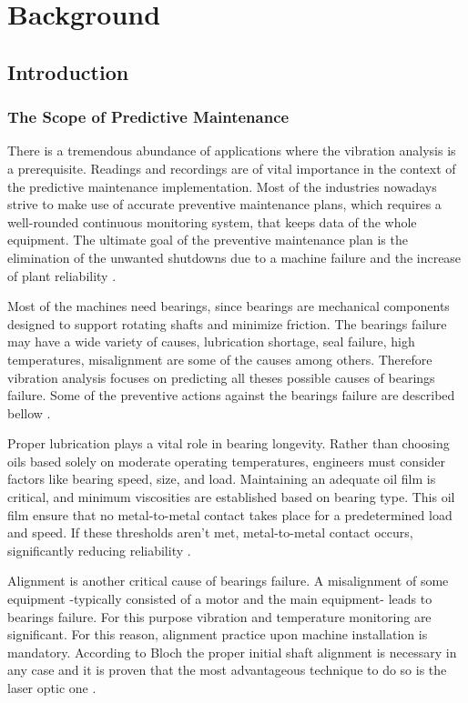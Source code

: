 \chapter{Background}
\label{chap2}



\section{Introduction}

\subsection{The Scope of Predictive Maintenance}
{

There is a tremendous abundance of applications where the vibration analysis is a prerequisite. Readings and recordings are of vital importance in the context of the predictive maintenance implementation. Most of the industries nowadays strive to make use of accurate preventive maintenance plans, which requires a well-rounded continuous monitoring system, that keeps data of the whole equipment. The ultimate goal of the preventive maintenance plan is the elimination of the unwanted shutdowns due to a machine failure and the increase of plant reliability \cite{DehayemNodem2011}.

Most of the machines need bearings, since bearings are mechanical components designed to support rotating shafts and minimize friction. The bearings failure may have a wide variety of causes, lubrication shortage, seal failure, high temperatures, misalignment are some of the causes among others. Therefore vibration analysis focuses on predicting all theses possible causes of bearings failure. Some of the preventive actions against the bearings failure are described bellow \cite{Li2001}.

Proper lubrication plays a vital role in bearing longevity. Rather than choosing oils based solely on moderate operating temperatures, engineers must consider factors like bearing speed, size, and load. Maintaining an adequate oil film is critical, and minimum viscosities are established based on bearing type. This oil film ensure that no metal-to-metal contact takes place for a predetermined load and speed. If these thresholds aren't met, metal-to-metal contact occurs, significantly reducing reliability \cite{Bloch1998}.

Alignment is another critical cause of bearings failure. A misalignment of some equipment -typically consisted of a motor and the main equipment- leads to bearings failure. For this purpose vibration and temperature monitoring are significant. For this reason, alignment practice upon machine installation is mandatory. According to Bloch the proper initial shaft alignment is necessary in any case and it is proven that the most advantageous technique to do so is the laser optic one \cite{Bloch1998}.

}
